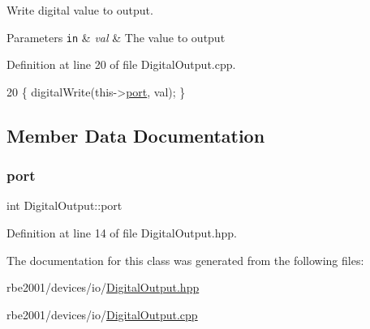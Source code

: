 Write digital value to output. 


\begin{DoxyParams}[1]{Parameters}
\mbox{\tt in}  & {\em val} & The value to output \\
\hline
\end{DoxyParams}


Definition at line 20 of file Digital\+Output.\+cpp.


\begin{DoxyCode}
20 \{ digitalWrite(this->\hyperlink{class_digital_output_a01596de4b8252bd9033507e6feea1cb9}{port}, val); \}
\end{DoxyCode}


\subsection{Member Data Documentation}
\mbox{\label{class_digital_output_a01596de4b8252bd9033507e6feea1cb9}} 
\subsubsection{\texorpdfstring{port}{port}}
{\footnotesize\ttfamily int Digital\+Output\+::port\hspace{0.3cm}{\ttfamily [private]}}



Definition at line 14 of file Digital\+Output.\+hpp.



The documentation for this class was generated from the following files\+:\begin{DoxyCompactItemize}
\item 
rbe2001/devices/io/\hyperlink{_digital_output_8hpp}{Digital\+Output.\+hpp}\item 
rbe2001/devices/io/\hyperlink{_digital_output_8cpp}{Digital\+Output.\+cpp}\end{DoxyCompactItemize}
